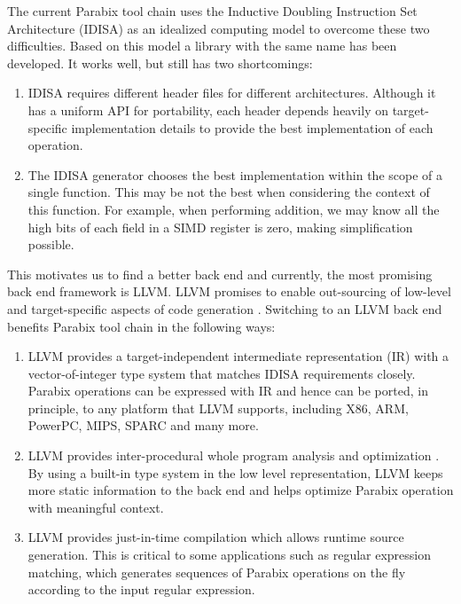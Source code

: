 The current Parabix tool chain uses the Inductive Doubling Instruction Set Architecture (IDISA) as an idealized computing model to overcome these two difficulties. Based on this model a library with the same name has been developed. It works well, but still has two shortcomings:

\begin{enumerate}
  \item IDISA requires different header files for different architectures. Although it has a uniform API for portability, each header depends heavily on target-specific implementation details to provide the best implementation of each operation.
  \item The IDISA generator \cite{hua_idisa} chooses the best implementation within the scope of a single function. This may be not the best when considering the context of this function. For example, when performing addition, we may know all the high bits of each field in a SIMD register is zero, making simplification possible.
\end{enumerate}

This motivates us to find a better back end and currently, the most promising back end framework is LLVM\@. LLVM promises to enable out-sourcing of low-level and target-specific aspects of code generation \cite{llvm_ghc, chris_msthesis}. Switching to an LLVM back end benefits Parabix tool chain in the following ways:

\begin{enumerate}
  \item LLVM provides a target-independent intermediate representation (IR) with a vector-of-integer type system that matches IDISA requirements closely. Parabix operations can be expressed with IR and hence can be ported, in principle, to any platform that LLVM supports, including X86, ARM, PowerPC, MIPS, SPARC and many more.
  \item LLVM provides inter-procedural whole program analysis and optimization \cite{llvm_cgo04}. By using a built-in type system in the low level representation, LLVM keeps more static information to the back end and helps optimize Parabix operation with meaningful context.
  \item LLVM provides just-in-time compilation which allows runtime source generation. This is critical to some applications such as regular expression matching, which generates sequences of Parabix operations on the fly according to the input regular expression.
\end{enumerate}

